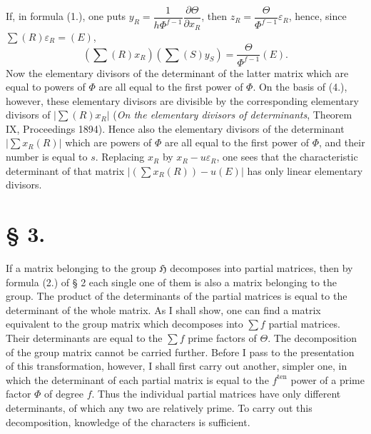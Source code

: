 \documentclass[11pt]{article}
\newcommand{\Hgrp}{\mathfrak{H}}
\newcommand{\eps}{\varepsilon}
\newcommand{\ten}{\mathrm{ten}}
\begin{document}
If, in formula (1.), one puts $y_R=\dfrac{1}{h\Phi^{f-1}}\dfrac{\partial\Theta}{\partial x_R}$, then $z_R=\dfrac{\Theta}{\Phi^{f-1}}\eps_R$, hence, since $\sum(R)\eps_R=(E)$,
\begin{equation}\tag{4.}
\left(\sum(R)x_R\right)\left(\sum(S)y_S\right)=\frac{\Theta}{\Phi^{f-1}}(E).
\end{equation}
Now the elementary divisors of the determinant of the latter matrix which are equal to powers of $\Phi$ are all equal to the first power of $\Phi$. On the basis of (4.), however, these elementary divisors are divisible by the corresponding elementary divisors of $\left|\sum(R)x_R\right|$ (\emph{On the elementary divisors of determinants}, Theorem IX, Proceedings 1894). Hence also the elementary divisors of the determinant $\left|\sum x_R(R)\right|$ which are powers of $\Phi$ are all equal to the first power of $\Phi$, and their number is equal to $s$. Replacing $x_R$ by $x_R-u\eps_R$, one sees that the characteristic determinant of that matrix $\left|\left(\sum x_R(R)\right)-u(E)\right|$ has only linear elementary divisors.

\section*{§ 3.}

If a matrix belonging to the group $\Hgrp$ decomposes into partial matrices, then by formula (2.) of § 2 each single one of them is also a matrix belonging to the group. The product of the determinants of the partial matrices is equal to the determinant of the whole matrix. As I shall show, one can find a matrix equivalent to the group matrix which decomposes into $\sum f$ partial matrices. Their determinants are equal to the $\sum f$ prime factors of $\Theta$. The decomposition of the group matrix cannot be carried further. Before I pass to the presentation of this transformation, however, I shall first carry out another, simpler one, in which the determinant of each partial matrix is equal to the $f^{\ten}$ power of a prime factor $\Phi$ of degree $f$. Thus the individual partial matrices have only different determinants, of which any two are relatively prime. To carry out this decomposition, knowledge of the characters is sufficient.
\end{document}
